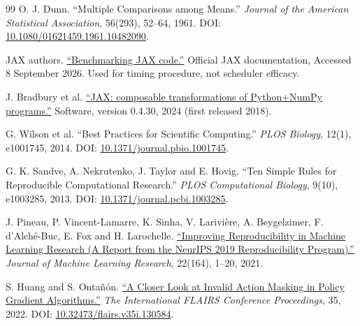 \documentclass[12pt,a4paper]{article}
\begin{document}
\begin{thebibliography}{99}
 O. J. Dunn. ``Multiple Comparisons among Means.'' \emph{Journal of the American Statistical Association}, 56(293), 52--64, 1961. DOI: \href{\detokenize{https://doi.org/10.1080/01621459.1961.10482090}}{10.1080/01621459.1961.10482090}.

 JAX authors. \href{\detokenize{https://docs.jax.dev/en/latest/benchmarking.html}}{``Benchmarking JAX code.''} Official JAX documentation, Accessed 8 September 2026. Used for timing procedure, not scheduler efficacy.

 J. Bradbury et al. \href{\detokenize{https://github.com/jax-ml/jax}}{``JAX: composable transformations of Python+NumPy programs.''} Software, version 0.4.30, 2024 (first released 2018).

 G. Wilson et al. ``Best Practices for Scientific Computing.'' \emph{PLOS Biology}, 12(1), e1001745, 2014. DOI: \href{\detokenize{https://journals.plos.org/plosbiology/article?id=10.1371/journal.pbio.1001745}}{10.1371/journal.pbio.1001745}.

 G. K. Sandve, A. Nekrutenko, J. Taylor and E. Hovig. ``Ten Simple Rules for Reproducible Computational Research.'' \emph{PLOS Computational Biology}, 9(10), e1003285, 2013. DOI: \href{\detokenize{https://journals.plos.org/ploscompbiol/article?id=10.1371/journal.pcbi.1003285}}{10.1371/journal.pcbi.1003285}.

 J. Pineau, P. Vincent-Lamarre, K. Sinha, V. Larivière, A. Beygelzimer, F. d'Alché-Buc, E. Fox and H. Larochelle. \href{\detokenize{https://jmlr.org/papers/v22/20-303.html}}{``Improving Reproducibility in Machine Learning Research (A Report from the NeurIPS 2019 Reproducibility Program).''} \emph{Journal of Machine Learning Research}, 22(164), 1--20, 2021.

 S. Huang and S. Ontañón. \href{\detokenize{https://arxiv.org/abs/2006.14171}}{``A Closer Look at Invalid Action Masking in Policy Gradient Algorithms.''} \emph{The International FLAIRS Conference Proceedings}, 35, 2022. DOI: \href{\detokenize{https://doi.org/10.32473/flairs.v35i.130584}}{10.32473/flairs.v35i.130584}.


\end{thebibliography}
\end{document}
